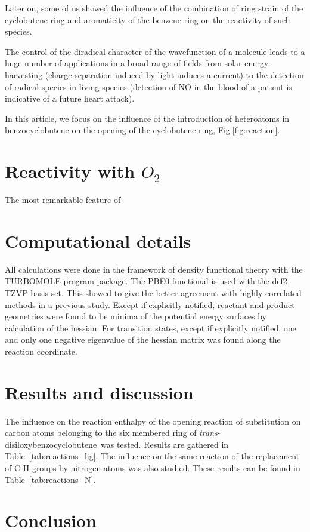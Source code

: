 \documentclass[final,3p,times,twocolumn]{elsarticle}
\newcommand{\trans}{\emph{trans}-disiloxybenzocyclobutene}
\begin{document}
Later on, some of us showed the influence of the combination
of ring strain of the cyclobutene ring and aromaticity of the
benzene ring on the reactivity of such species.\cite{Nava2014a}

The control of the diradical character of the wavefunction
of a molecule leads to a huge number of applications 
in a broad range of fields from solar energy harvesting
(charge separation induced by light induces a current)
to the detection of radical species in living species
(detection of NO in the blood of a patient is indicative
of a future heart attack).

In this article, we focus on the influence of the introduction
of heteroatoms in benzocyclobutene on the opening
of the cyclobutene ring, Fig.\ref{fig:reaction}.
\section{Reactivity with $O_2$}
The most remarkable feature of 
\section{Computational details}
\label{sec:computational_details}
All calculations were done in the framework of density
functional theory with the TURBOMOLE program package.
The PBE0 functional is used with the def2-TZVP basis
set.\cite{pbe0,def2tzvp}
This showed to give the better agreement with highly correlated
methods in a previous study.\cite{Nava2014a}
Except if explicitly notified, reactant and product geometries
were found to be minima of the potential energy surfaces
by calculation of the hessian.
For transition states, except if explicitly notified, one and
only one negative eigenvalue
of the hessian matrix was found along the reaction coordinate.
\section{Results and discussion}
\label{sec:results_and_discussion}
The influence on the reaction enthalpy of the opening reaction
of substitution on carbon atoms belonging to
the six membered ring of \trans\ was tested.
Results are gathered in Table~\ref{tab:reactions_lig}.
The influence on the same reaction of the replacement
of C-H groups by nitrogen atoms was also studied.
These results can be found in Table~\ref{tab:reactions_N}.
\section{Conclusion}
\label{sec:conclusion}
\end{document}
